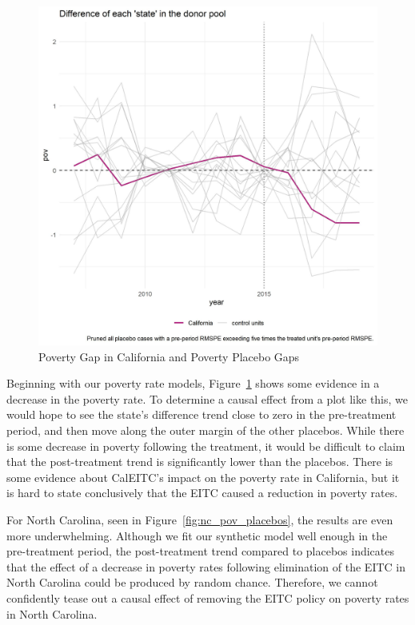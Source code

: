 \documentclass{article}
\begin{document}
 \begin{figure}[H]
    \caption{Poverty Gap in California and Poverty Placebo Gaps}
    \begin{center}
        \includegraphics[width=.85\textwidth]{ca_pov_placebos}
    \end{center}
    \label{fig:ca_pov_placebos}{}
\end{figure}

Beginning with our poverty rate models, Figure~\ref{fig:ca_pov_placebos} shows some evidence in a decrease in the poverty rate. To determine a causal effect from a plot like this, we would hope to see the state's difference trend close to zero in the pre-treatment period, and then move along the outer margin of the other placebos. While there is some decrease in poverty following the treatment, it would be difficult to claim that the post-treatment trend is significantly lower than the placebos. There is some evidence about CalEITC's impact on the poverty rate in California, but it is hard to state conclusively that the EITC caused a reduction in poverty rates. 

For North Carolina, seen in Figure~\ref{fig:nc_pov_placebos}, the results are even more underwhelming. Although we fit our synthetic model well enough in the pre-treatment period, the post-treatment trend compared to placebos indicates that the effect of a decrease in poverty rates following elimination of the EITC in North Carolina could be produced by random chance. Therefore, we cannot confidently tease out a causal effect of removing the EITC policy on poverty rates in North Carolina. 
\end{document}
